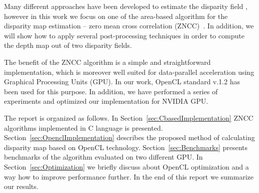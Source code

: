 \documentclass[conference]{IEEEtran}
\begin{document}
Many different approaches have been developed to estimate the disparity field \cite{Redert99}, however in this work we focus on one of the area-based algorithm for the disparity map estimation -- zero mean cross correlation (ZNCC)~\cite{aschwanden92}. In addition, we will show how to apply several post-processing techniques in order to compute the depth map out of two disparity fields. 

The benefit of the ZNCC algorithm is a simple and straightforward implementation, which is moreover well suited for data-parallel acceleration using Graphical Processing Units (GPU). In our work, OpenCL standard v.1.2 has been used for this purpose. In addition, we have performed a series of experiments and optimized our implementation for NVIDIA GPU.

The report is organized as follows. In Section~\ref{sec:CbasedImplementation} ZNCC algorithms implemented in C language is presented. Section~\ref{sec:OpenclImplementation} describes the proposed method of calculating disparity map based on OpenCL technology. Section~\ref{sec:Benchmarks} presents benchmarks of the algorithm evaluated on two different GPU. In Section~\ref{sec:Optimization} we briefly discuss about OpenCL optimization and a way how to improve performance further. In the end of this report we summarize our results.
\end{document}
